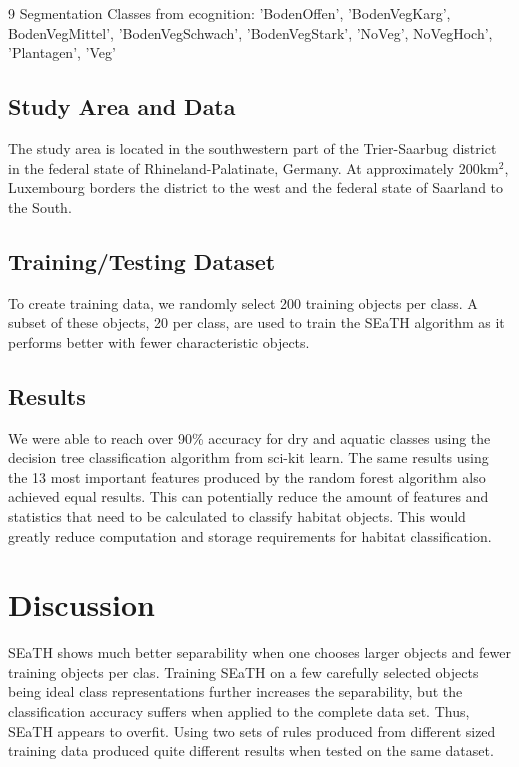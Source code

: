 \documentclass[authoryear, review,12pt,number]{elsarticle}
\begin{document}
9 Segmentation Classes from ecognition:
'BodenOffen', 'BodenVegKarg', BodenVegMittel', 'BodenVegSchwach',
'BodenVegStark', 'NoVeg', NoVegHoch', 'Plantagen', 'Veg'

\subsection{Study Area and Data}
The study area is located in the southwestern part of the Trier-Saarbug district
in the federal state of Rhineland-Palatinate, Germany. At approximately
200km$^{2}$, Luxembourg borders the district to the west and the federal state
of Saarland to the South.



\subsection{Training/Testing Dataset}
To create training data, we randomly select 200 training objects per class. A
subset of these objects, 20 per class, are used to train the SEaTH
algorithm as it performs better with fewer characteristic objects.
\subsection{Results}
We were able to reach over 90\% accuracy for dry and aquatic classes using the
decision tree classification algorithm from sci-kit learn. The same results
using the 13 most important features produced by the random forest algorithm
also achieved equal results. This can potentially reduce the amount of features
and statistics that need to be calculated to classify habitat objects. This
would greatly reduce computation and storage requirements for habitat
classification.
\section{Discussion}
SEaTH shows much better separability when one chooses larger objects and fewer
training objects per clas. Training SEaTH on a few carefully selected objects
being ideal class representations further increases the separability, but the classification
accuracy suffers when applied to the complete data set. Thus, SEaTH appears to
overfit. Using two sets of rules produced from different sized training data
produced quite different results when tested on the same dataset.
\end{document}
